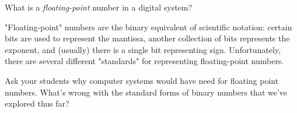 

What is a {\it floating-point} number in a digital system?







"Floating-point" numbers are the binary equivalent of scientific notation: certain bits are used to represent the mantissa, another collection of bits represents the exponent, and (usually) there is a single bit representing sign.  Unfortunately, there are several different "standards" for representing floating-point numbers.







Ask your students why computer systems would have need for floating point numbers.  What's wrong with the standard forms of binary numbers that we've explored thus far?




